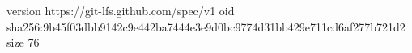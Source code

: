 version https://git-lfs.github.com/spec/v1
oid sha256:9b45f03dbb9142c9e442ba7444e3e9d0bc9774d31bb429e711cd6af277b721d2
size 76
